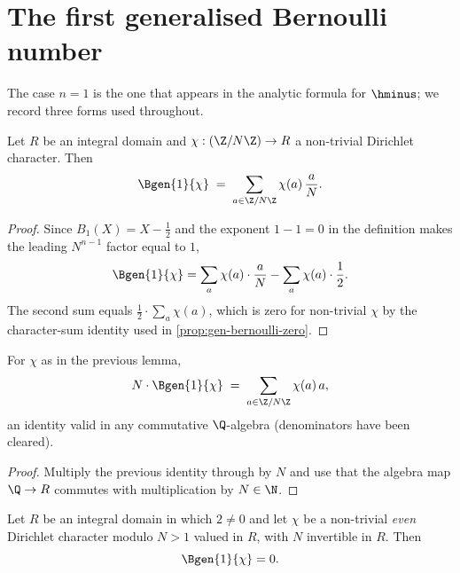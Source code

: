 \section{The first generalised Bernoulli number}

The case $n = 1$ is the one that appears in the analytic formula for
$\hminus$; we record three forms used throughout.

\begin{lemma}
  \label{lem:gen-bernoulli-one-intermediate}
  \leanok
Let $R$ be an integral domain and $\chi : (\Z/N\Z) \to R$ a non-trivial
Dirichlet character. Then
\[
  \Bgen{1}{\chi}
  \;=\;
  \sum_{a \in \Z/N\Z} \chi(a)\,\frac{a}{N}.
\]
\end{lemma}

\begin{proof}\leanok
Since $B_1(X) = X - \tfrac12$ and the exponent $1 - 1 = 0$ in the
definition makes the leading $N^{n-1}$ factor equal to $1$,
\[
  \Bgen{1}{\chi}
  = \sum_a \chi(a) \cdot \frac{a}{N}
  - \sum_a \chi(a) \cdot \frac{1}{2}.
\]
The second sum equals $\tfrac12 \cdot \sum_a \chi(a)$, which is zero
for non-trivial $\chi$ by the character-sum identity used in
\cref{prop:gen-bernoulli-zero}.
\end{proof}

\begin{lemma}
  \label{lem:gen-bernoulli-one-cleared}
  \leanok
For $\chi$ as in the previous lemma,
\[
  N \cdot \Bgen{1}{\chi}
  \;=\;
  \sum_{a \in \Z/N\Z} \chi(a)\,a,
\]
an identity valid in any commutative $\Q$-algebra (denominators have
been cleared).
\end{lemma}

\begin{proof}\leanok
Multiply the previous identity through by $N$ and use that the
algebra map $\Q \to R$ commutes with multiplication by $N \in \N$.
\end{proof}

\begin{proposition}[Parity vanishing at $n = 1$]
  \label{prop:gen-bernoulli-one-even}
  \leanok
Let $R$ be an integral domain in which $2 \ne 0$ and let $\chi$ be a
non-trivial \emph{even} Dirichlet character modulo $N > 1$ valued in
$R$, with $N$ invertible in $R$. Then
\[
  \Bgen{1}{\chi} = 0.
\]
\end{proposition}

